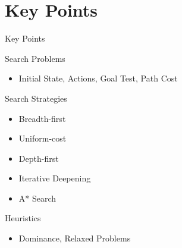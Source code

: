 \documentclass[14pt]{beamer}
\begin{document}
\part{Key Points}
\begin{frame}[label=key-points]{Key Points}
	\begin{block}{Search Problems}
		\begin{itemize}
			\item Initial State, Actions, Goal Test, Path Cost
		\end{itemize}
	\end{block}
	\begin{block}{Search Strategies}
		\begin{itemize}
			\item Breadth-first
			\item Uniform-cost
			\item Depth-first
			\item Iterative Deepening
			\item A* Search
		\end{itemize}
	\end{block}
	\begin{block}{Heuristics}
		\begin{itemize}
			\item Dominance, Relaxed Problems
		\end{itemize}
	\end{block}
\end{frame}
\end{document}
